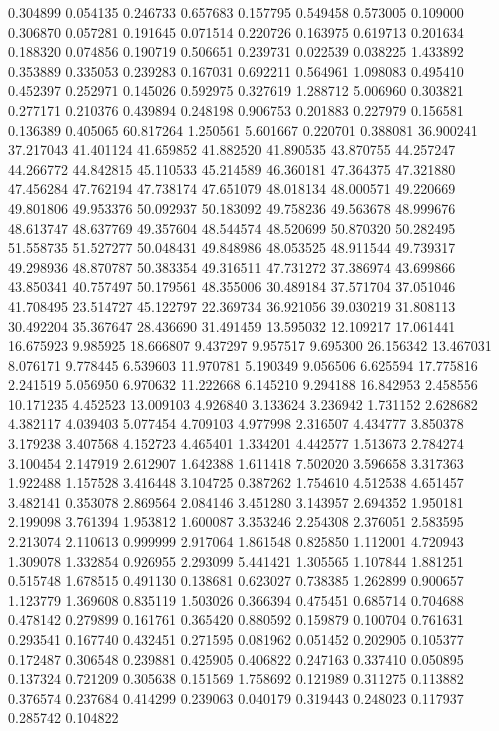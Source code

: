 0.304899
0.054135
0.246733
0.657683
0.157795
0.549458
0.573005
0.109000
0.306870
0.057281
0.191645
0.071514
0.220726
0.163975
0.619713
0.201634
0.188320
0.074856
0.190719
0.506651
0.239731
0.022539
0.038225
1.433892
0.353889
0.335053
0.239283
0.167031
0.692211
0.564961
1.098083
0.495410
0.452397
0.252971
0.145026
0.592975
0.327619
1.288712
5.006960
0.303821
0.277171
0.210376
0.439894
0.248198
0.906753
0.201883
0.227979
0.156581
0.136389
0.405065
60.817264
1.250561
5.601667
0.220701
0.388081
36.900241
37.217043
41.401124
41.659852
41.882520
41.890535
43.870755
44.257247
44.266772
44.842815
45.110533
45.214589
46.360181
47.364375
47.321880
47.456284
47.762194
47.738174
47.651079
48.018134
48.000571
49.220669
49.801806
49.953376
50.092937
50.183092
49.758236
49.563678
48.999676
48.613747
48.637769
49.357604
48.544574
48.520699
50.870320
50.282495
51.558735
51.527277
50.048431
49.848986
48.053525
48.911544
49.739317
49.298936
48.870787
50.383354
49.316511
47.731272
37.386974
43.699866
43.850341
40.757497
50.179561
48.355006
30.489184
37.571704
37.051046
41.708495
23.514727
45.122797
22.369734
36.921056
39.030219
31.808113
30.492204
35.367647
28.436690
31.491459
13.595032
12.109217
17.061441
16.675923
9.985925
18.666807
9.437297
9.957517
9.695300
26.156342
13.467031
8.076171
9.778445
6.539603
11.970781
5.190349
9.056506
6.625594
17.775816
2.241519
5.056950
6.970632
11.222668
6.145210
9.294188
16.842953
2.458556
10.171235
4.452523
13.009103
4.926840
3.133624
3.236942
1.731152
2.628682
4.382117
4.039403
5.077454
4.709103
4.977998
2.316507
4.434777
3.850378
3.179238
3.407568
4.152723
4.465401
1.334201
4.442577
1.513673
2.784274
3.100454
2.147919
2.612907
1.642388
1.611418
7.502020
3.596658
3.317363
1.922488
1.157528
3.416448
3.104725
0.387262
1.754610
4.512538
4.651457
3.482141
0.353078
2.869564
2.084146
3.451280
3.143957
2.694352
1.950181
2.199098
3.761394
1.953812
1.600087
3.353246
2.254308
2.376051
2.583595
2.213074
2.110613
0.999999
2.917064
1.861548
0.825850
1.112001
4.720943
1.309078
1.332854
0.926955
2.293099
5.441421
1.305565
1.107844
1.881251
0.515748
1.678515
0.491130
0.138681
0.623027
0.738385
1.262899
0.900657
1.123779
1.369608
0.835119
1.503026
0.366394
0.475451
0.685714
0.704688
0.478142
0.279899
0.161761
0.365420
0.880592
0.159879
0.100704
0.761631
0.293541
0.167740
0.432451
0.271595
0.081962
0.051452
0.202905
0.105377
0.172487
0.306548
0.239881
0.425905
0.406822
0.247163
0.337410
0.050895
0.137324
0.721209
0.305638
0.151569
1.758692
0.121989
0.311275
0.113882
0.376574
0.237684
0.414299
0.239063
0.040179
0.319443
0.248023
0.117937
0.285742
0.104822
